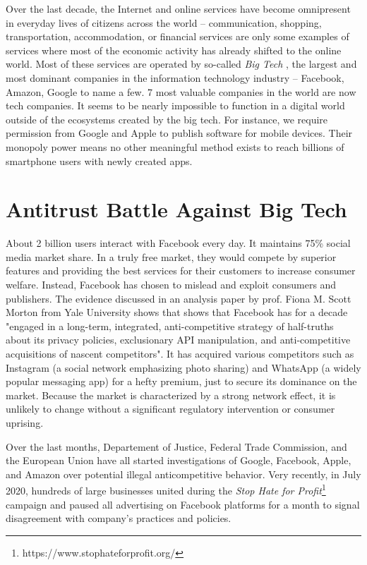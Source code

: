 Over the last decade, the Internet and online services have become omnipresent in everyday lives of citizens across the world – communication, shopping, transportation, accommodation, or financial services are only some examples of services where most of the economic activity has already shifted to the online world. Most of these services are operated by so-called \textit{Big Tech} \cite{bigtech}, the largest and most dominant companies in the information technology industry – Facebook, Amazon, Google to name a few. 7 most valuable companies in the world are now tech companies. It seems to be nearly impossible to function in a digital world outside of the ecosystems created by the big tech. For instance, we require permission from Google and Apple to publish software for mobile devices. Their monopoly power means no other meaningful method exists to reach billions of smartphone users with newly created apps.

\section{Antitrust Battle Against Big Tech}

About 2 billion users interact with Facebook every day. It maintains 75\% social media market share. In a truly free market, they would compete by superior features and providing the best services for their customers to increase consumer welfare. Instead, Facebook has chosen to mislead and exploit consumers and publishers. The evidence discussed in an analysis paper by prof. Fiona M. Scott Morton from Yale University shows that \cite{antitrust} shows that Facebook has for a decade "engaged in a long-term,
integrated, anti-competitive strategy of half-truths about its privacy policies, exclusionary API manipulation, and anti-competitive acquisitions of nascent competitors". It has acquired various competitors such as Instagram (a social network emphasizing photo sharing) and WhatsApp (a widely popular messaging app) for a hefty premium, just to secure its dominance on the market. Because the market is characterized by a strong network effect, it is unlikely to change without a significant regulatory intervention or consumer uprising.

Over the last months, Departement of Justice, Federal Trade Commission, and the European Union have all started investigations of Google, Facebook, Apple, and Amazon over potential illegal anticompetitive behavior. Very recently, in July 2020, hundreds of large businesses united during the \textit{Stop Hate for Profit}\footnote{https://www.stophateforprofit.org/} campaign and paused all advertising on Facebook platforms for a month to signal disagreement with company's practices and policies.

